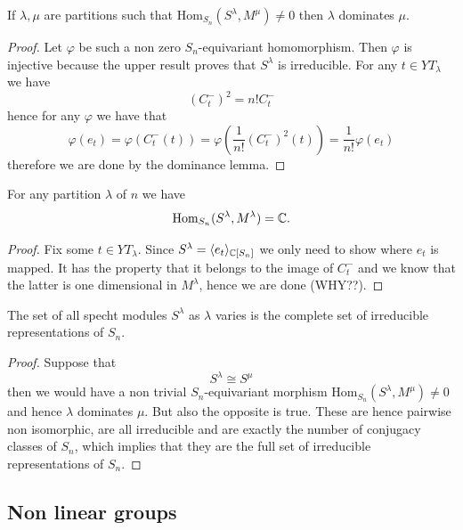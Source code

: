 \documentclass[11pt]{scrartcl}
\begin{document}
	\begin{proposition}
		If $\lambda,\mu$ are partitions such that $\text{Hom}_{S_n}(S^\lambda,M^\mu)\ne 0$ then $\lambda$ dominates $\mu$.
	\end{proposition}
	\begin{proof}
		Let $\varphi$ be such a non zero $S_n$-equivariant homomorphism. Then $\varphi$ is injective because the upper result proves that $S^\lambda$ is irreducible. For any $t\in YT_\lambda$ we have
		$$\left(C_t^-\right)^2=n!C_t^-$$
		hence for any $\varphi$ we have that
		$$\varphi(e_t)=\varphi(C_t^-(t))=\varphi\left(\frac{1}{n!}\left(C_t^-\right)^2(t)\right)=\frac{1}{n!}\varphi(e_t)$$
		therefore we are done by the dominance lemma.
	\end{proof}
	\begin{proposition}
		For any partition $\lambda$ of $n$ we have
		$$\text{Hom}_{S_n}(S^\lambda,M^\lambda)=\mathbb C.$$
	\end{proposition}
	\begin{proof}
		Fix some $t\in YT_\lambda$. Since $S^\lambda=\langle e_t\rangle_{\mathbb C[S_n]}$ we only need to show where $e_t$ is mapped. It has the property that it belongs to the image of $C_t^-$ and we know that the latter is one dimensional in $M^\lambda$, hence we are done (WHY??).
	\end{proof}
	\begin{theorem}
		The set of all specht modules $S^\lambda$ as $\lambda$ varies is the complete set of irreducible representations of $S_n$.
	\end{theorem}
	\begin{proof}
		Suppose that 
		$$S^\lambda \cong S^\mu$$
		then we would have a non trivial $S_n$-equivariant morphism $\text{Hom}_{S_n}(S^\lambda,M^\mu)\ne 0$ and hence $\lambda$ dominates $\mu$. But also the opposite is true. These are hence pairwise non isomorphic, are all irreducible and are exactly the number of conjugacy classes of $S_n$, which implies that they are the full set of irreducible representations of $S_n$. 
	\end{proof}
	
	\subsection{Non linear groups}
	
\end{document}
